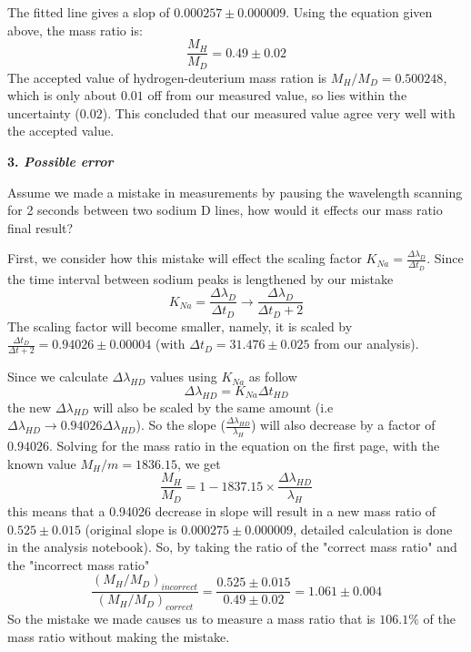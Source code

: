 \documentclass[12pt]{article}
\begin{document}
The fitted line gives a slop of $0.000257 \pm 0.000009$. Using the equation given above, the mass ratio is: $$\frac{M_H}{M_D} = 0.49 \pm 0.02$$
The accepted value of hydrogen-deuterium mass ration is $M_H/M_D = 0.500248$, which is only about $0.01$ off from our measured value, so lies within the uncertainty ($0.02$). This concluded that our measured value agree very well with the accepted value.
\bigskip

\textbf{3. \textit{Possible error}}
\smallskip

Assume we made a mistake in measurements by pausing the wavelength scanning for 2 seconds between two sodium D lines, how would it effects our mass ratio final result?
\smallskip

First, we consider how this mistake will effect the scaling factor $K_{Na} = \frac{\Delta \lambda_{D}}{\Delta t_D}$. Since the time interval between sodium peaks is lengthened by our mistake
$$K_{Na} = \frac{\Delta \lambda_{D}}{\Delta t_D} \rightarrow \frac{\Delta \lambda_{D}}{\Delta t_D + 2}$$
The scaling factor will become smaller, namely, it is scaled by $\frac{\Delta t_D}{\Delta t +2} = 0.94026 \pm 0.00004$ (with $\Delta t_D = 31.476 \pm 0.025$ from our analysis).

Since we calculate $\Delta \lambda_{HD}$ values using $ K_{Na}$ as follow
$$ \Delta \lambda_{HD} = K_{Na} \Delta t_{HD}$$
the new $\Delta \lambda_{HD}$ will also be scaled by the same amount (i.e $\Delta \lambda_{HD} \rightarrow 0.94026 \Delta \lambda_{HD}$). So the slope ($\frac{\Delta \lambda_{HD}}{\lambda_H}$) will also decrease by a factor of $0.94026$. Solving for the mass ratio in the equation on the first page, with the known value $M_H / m = 1836.15$, we get 
$$\frac{M_H}{M_D} = 1- 1837.15 \times \frac{\Delta \lambda_{HD}}{\lambda_H}$$
this means that a 0.94026 decrease in slope will result in a new mass ratio of $0.525 \pm 0.015$ (original slope is $0.000275 \pm 0.000009$, detailed calculation is done in the analysis notebook). So, by taking the ratio of the "correct mass ratio" and the "incorrect mass ratio" 
$$\frac{(M_H/M_D)_{incorrect}}{(M_H/M_D)_{correct}} = \frac{0.525 \pm 0.015}{0.49 \pm 0.02} = 1.061 \pm 0.004$$
So the mistake we made causes us to measure a mass ratio that is $106.1 \%$ of the mass ratio without making the mistake.  
\end{document}
